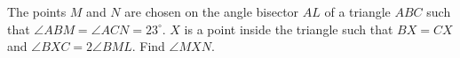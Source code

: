 The points $M$ and $N$ are chosen on the angle bisector $AL$ of a triangle $ABC$ such that $\angle ABM=\angle ACN=23^{\circ}$. $X$ is a point inside the triangle such that $BX=CX$ and $\angle BXC=2\angle BML$. Find $\angle MXN$.